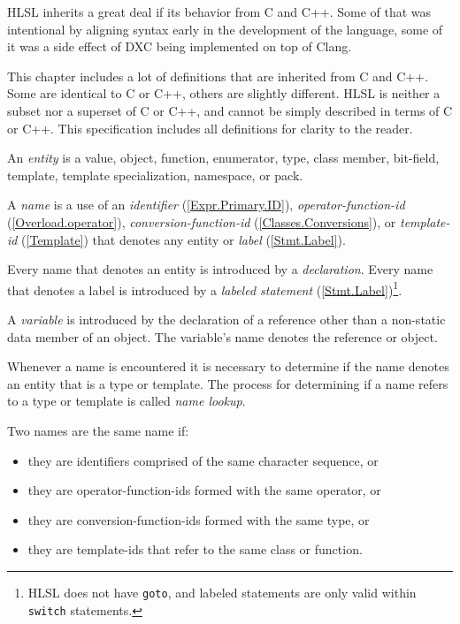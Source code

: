 
\begin{note}
  \p HLSL inherits a great deal if its behavior from C and C++. Some of that was
  intentional by aligning syntax early in the development of the language, some
  of it was a side effect of DXC being implemented on top of Clang.

  \p This chapter includes a lot of definitions that are inherited from C and C++.
  Some are identical to C or C++, others are slightly different. HLSL is neither
  a subset nor a superset of C or C++, and cannot be simply described in terms
  of C or C++. This specification includes all definitions for clarity to the
  reader.
\end{note}


\p An \textit{entity} is a value, object, function, enumerator, type, class
member, bit-field, template, template specialization, namespace, or pack.

\p A \textit{name} is a use of an \textit{identifier} (\ref{Expr.Primary.ID}),
\textit{operator-function-id} (\ref{Overload.operator}),
\textit{conversion-function-id} (\ref{Classes.Conversions}),
or \textit{template-id} (\ref{Template}) that denotes any entity or
\textit{label} (\ref{Stmt.Label}).

\p Every name that denotes an entity is introduced by a \textit{declaration}.
Every name that denotes a label is introduced by a \textit{labeled statement}
(\ref{Stmt.Label})\footnote{HLSL does not have \texttt{goto}, and labeled
statements are only valid within \texttt{switch} statements.}.

\p A \textit{variable} is introduced by the declaration of a reference other
than a non-static data member of an object. The variable's name denotes the
reference or object.

\p Whenever a name is encountered it is necessary to determine if the name
denotes an entity that is a type or template. The process for determining if a
name refers to a type or template is called \textit{name lookup}.

\p Two names are the same name if:
\begin{itemize}
\item they are identifiers comprised of the same character sequence, or
\item they are operator-function-ids formed with the same operator, or
\item they are conversion-function-ids formed with the same type, or
\item they are template-ids that refer to the same class or function.
\end{itemize}

